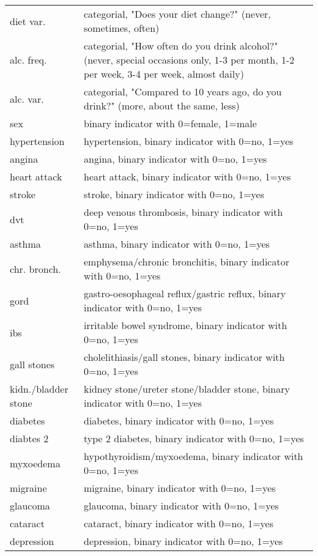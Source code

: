 \begin{longtable}[c]{lp{8cm}}
        diet var.	&	categorial, "Does your diet change?" (never, sometimes, often)	\\
        alc. freq.	&	categorial, "How often do you drink alcohol?" (never, special occasions only, 1-3 per month, 1-2 per week, 3-4 per week, almost daily)	\\
        alc. var.	&	categorial, "Compared to 10 years ago, do you drink?" (more, about the same, less)	\\
        sex	&	binary indicator with 0=female, 1=male	\\
        hypertension	&	hypertension, binary indicator with 0=no, 1=yes	\\
        angina	&	angina, binary indicator with 0=no, 1=yes	\\
        heart attack	&	heart attack, binary indicator with 0=no, 1=yes	\\
        stroke	&	stroke, binary indicator with 0=no, 1=yes	\\
        dvt	&	deep venous thrombosis, binary indicator with 0=no, 1=yes	\\
        asthma	&	asthma, binary indicator with 0=no, 1=yes	\\
        chr. bronch.	&	emphysema/chronic bronchitis,  binary indicator with 0=no, 1=yes	\\
        gord	&	gastro-oesophageal reflux/gastric reflux, binary indicator with 0=no, 1=yes	\\
        ibs	&	irritable bowel syndrome, binary indicator with 0=no, 1=yes	\\
        gall stones	&	cholelithiasis/gall stones, binary indicator with 0=no, 1=yes	\\
        kidn./bladder stone 	&	kidney stone/ureter stone/bladder stone, binary indicator with 0=no, 1=yes	\\
        diabetes	&	diabetes, binary indicator with 0=no, 1=yes	\\
        diabtes 2	&	type 2 diabetes, binary indicator with 0=no, 1=yes	\\
        myxoedema	&	hypothyroidism/myxoedema, binary indicator with 0=no, 1=yes	\\
        migraine	&	migraine, binary indicator with 0=no, 1=yes	\\
        glaucoma	&	glaucoma, binary indicator with 0=no, 1=yes	\\
        cataract	&	cataract, binary indicator with 0=no, 1=yes	\\
        depression	&	depression, binary indicator with 0=no, 1=yes	\\

\end{longtable}
